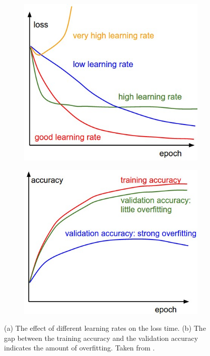 \begin{figure}[htpb]
\centering
\begin{subfigure}{0.45\textwidth}
\includegraphics[width=\textwidth]{Part1/chapter2/chapter/figs/learningrates.jpeg}
\caption{}
\label{fig.lr}
\end{subfigure}%
\qquad
\begin{subfigure}{0.45\textwidth}
\includegraphics[width=\textwidth]{Part1/chapter2/chapter/figs/accuracies.jpeg}
\caption{}
\label{fig.accuracies}
\end{subfigure}
\caption[Examples of accuracy and loss rate during training]{(a) The effect of different learning rates on the loss time.  (b) The gap between the training accuracy and the validation accuracy indicates the amount of overfitting. Taken from \citet{Karpathy3}.}
\label{fig.best_case}
\end{figure}
